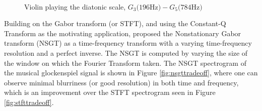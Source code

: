 \documentclass[report.tex]{subfiles}
\begin{document}
\begin{figure}[ht]
	\centering
	\\
	\caption{Violin playing the diatonic scale, $G_{3} \text{(196Hz)} - G_{5} \text{(784Hz)}$ \parencite[430]{jbrown}}
	\label{fig:violin}
\end{figure}

Building on the Gabor transform (or STFT), and using the Constant-Q Transform as the motivating application, \textcite{balazs} proposed the Nonstationary Gabor transform (NSGT) as a time-frequency transform with a varying time-frequency resolution and a perfect inverse. The NSGT is computed by varying the size of the window on which the Fourier Transform taken. The NSGT spectrogram of the musical glockenspiel signal is shown in Figure \ref{fig:nsgttradeoff}, where one can observe minimal blurriness (or good resolution) in both time and frequency, which is an improvement over the STFT spectrogram seen in Figure \ref{fig:stfttradeoff}.
\end{document}
